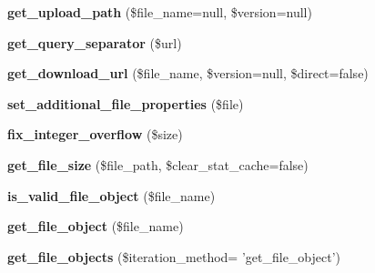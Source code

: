 \begin{DoxyCompactItemize}
\item 
\hypertarget{class_upload_handler_aa28df548183f4309edb5df9db306e980}{{\bfseries get\-\_\-upload\-\_\-path} (\$file\-\_\-name=null, \$version=null)}\label{class_upload_handler_aa28df548183f4309edb5df9db306e980}

\item 
\hypertarget{class_upload_handler_adc2132153d7fe1f1d508da4adae5c5a4}{{\bfseries get\-\_\-query\-\_\-separator} (\$url)}\label{class_upload_handler_adc2132153d7fe1f1d508da4adae5c5a4}

\item 
\hypertarget{class_upload_handler_a7bbc4074999d49c1bcec1e2333a5b6a0}{{\bfseries get\-\_\-download\-\_\-url} (\$file\-\_\-name, \$version=null, \$direct=false)}\label{class_upload_handler_a7bbc4074999d49c1bcec1e2333a5b6a0}

\item 
\hypertarget{class_upload_handler_aa05c4d932e762066ed2f52de2127b709}{{\bfseries set\-\_\-additional\-\_\-file\-\_\-properties} (\$file)}\label{class_upload_handler_aa05c4d932e762066ed2f52de2127b709}

\item 
\hypertarget{class_upload_handler_a9abdfd2889f4f707aa38362ee5d163e7}{{\bfseries fix\-\_\-integer\-\_\-overflow} (\$size)}\label{class_upload_handler_a9abdfd2889f4f707aa38362ee5d163e7}

\item 
\hypertarget{class_upload_handler_ad289968336f13388030bce7977ceb3b8}{{\bfseries get\-\_\-file\-\_\-size} (\$file\-\_\-path, \$clear\-\_\-stat\-\_\-cache=false)}\label{class_upload_handler_ad289968336f13388030bce7977ceb3b8}

\item 
\hypertarget{class_upload_handler_a63648aea7aa000b5f9094a76a04f03c5}{{\bfseries is\-\_\-valid\-\_\-file\-\_\-object} (\$file\-\_\-name)}\label{class_upload_handler_a63648aea7aa000b5f9094a76a04f03c5}

\item 
\hypertarget{class_upload_handler_acbb37fa4e6d01199791a96a674a600fc}{{\bfseries get\-\_\-file\-\_\-object} (\$file\-\_\-name)}\label{class_upload_handler_acbb37fa4e6d01199791a96a674a600fc}

\item 
\hypertarget{class_upload_handler_a536813f557bff2361c01efa1ce27a974}{{\bfseries get\-\_\-file\-\_\-objects} (\$iteration\-\_\-method= 'get\-\_\-file\-\_\-object')}\label{class_upload_handler_a536813f557bff2361c01efa1ce27a974}


\end{DoxyCompactItemize}

